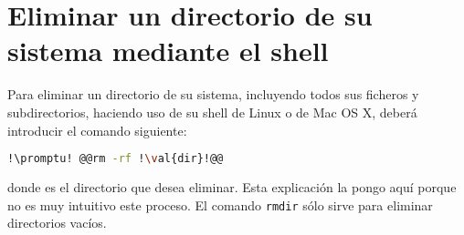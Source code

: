 \section{Eliminar un directorio de su sistema mediante el shell}\label{sec:elim-dir.tex}
Para eliminar un directorio de su sistema, incluyendo todos sus ficheros y subdirectorios, haciendo uso de su
shell de Linux o de Mac OS X, deberá introducir el comando siguiente:

\begin{lstlisting}[gobble=2,language=bash,style=bashinteract,escapechar=!]
  !\promptu! @@rm -rf !\val{dir}!@@
\end{lstlisting}

\noindent donde  es el directorio que desea eliminar. Esta explicación la pongo aquí porque no es muy
intuitivo este proceso. El comando \lstinline!rmdir! sólo sirve para eliminar directorios vacíos.
